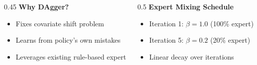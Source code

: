 \documentclass[aspectratio=169,9pt]{beamer}
\begin{document}
\begin{frame}
\begin{center}
\begin{tikzpicture}[node distance=0.6cm, scale=0.8, transform shape]
\end{tikzpicture}
\end{center}

\vspace{0.2cm}

\begin{columns}[T]
\begin{column}{0.45\textwidth}
\textbf{\small Why DAgger?}
\begin{itemize}\setlength{\itemsep}{1pt}
    \item[\tiny$\bullet$] \footnotesize Fixes covariate shift problem
    \item[\tiny$\bullet$] \footnotesize Learns from policy's own mistakes
    \item[\tiny$\bullet$] \footnotesize Leverages existing rule-based expert
\end{itemize}
\end{column}

\begin{column}{0.5\textwidth}
\textbf{\small Expert Mixing Schedule}
\begin{itemize}\setlength{\itemsep}{1pt}
    \item[\tiny$\bullet$] \footnotesize Iteration 1: $\beta = 1.0$ (100\% expert)
    \item[\tiny$\bullet$] \footnotesize Iteration 5: $\beta = 0.2$ (20\% expert)
    \item[\tiny$\bullet$] \footnotesize Linear decay over iterations
\end{itemize}
\end{column}
\end{columns}
\end{frame}
\end{document}
